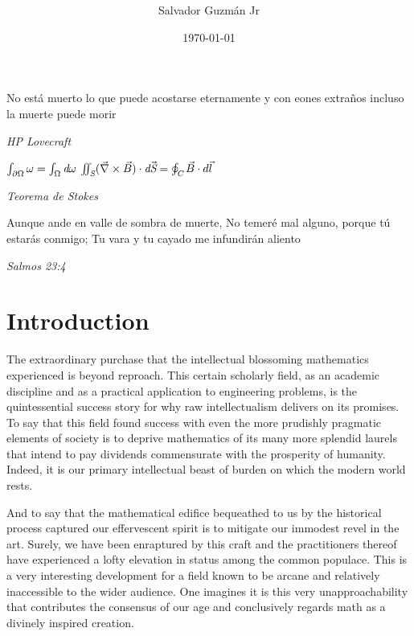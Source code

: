 \documentclass{article}
\begin{document}
	\title{
		\Large{
		}
	}
	
	\author{Salvador Guzm\'{a}n Jr}
	\date{\today}
	\maketitle
	
	\pagebreak
	\begin{center}
		\epigraph{
			No est\'{a} muerto lo que puede acostarse eternamente
			y con eones extraños  incluso la muerte
			puede morir
		}{\textit{
				HP Lovecraft
		}}
		\epigraph{
			\begin{math}
				\int_{\partial\Omega} \omega=\int_{\Omega} \emph{d}\omega
			\end{math}
			\linebreak
			\linebreak
			\begin{math}
				\iint_{\emph{S}}(\vec{\nabla}\times\vec{B})\cdot \emph{d}\vec{\emph{S}}=\oint_{\emph{C}}\vec{B}\cdot d \vec{l}
			\end{math}
		}{
			\textit{Teorema de Stokes}
		}
		
		\epigraph{
			Aunque ande en valle de sombra de muerte,
			No temeré mal alguno, porque tú estarás conmigo;
			Tu vara y tu cayado me infundirán aliento
		}{
			\textit{Salmos 23:4}
		}
	\end{center}
	\pagebreak
	\tableofcontents
	\pagebreak
	
	\section{Introduction}
	The extraordinary purchase that the intellectual blossoming mathematics experienced is beyond reproach. This certain scholarly field, as an academic discipline and as a practical application to engineering problems, is the quintessential success story for why raw intellectualism delivers on its promises. To say that this field found success with even the more prudishly pragmatic elements of society is to deprive mathematics of its many more splendid laurels that intend to pay dividends commensurate with the prosperity of humanity. Indeed, it is our primary intellectual beast of burden on which the modern world rests.
	
	And to say that the mathematical edifice bequeathed to us by the historical process captured our effervescent spirit is to mitigate our immodest revel in the art. Surely, we have been enraptured by this craft and the practitioners thereof have experienced a lofty elevation in status among the common populace. This is a very interesting development for a field known to be arcane and relatively inaccessible to the wider audience. One imagines it is this very unapproachability that contributes the consensus of our age and conclusively regards math as a divinely inspired creation.
	
\end{document}
